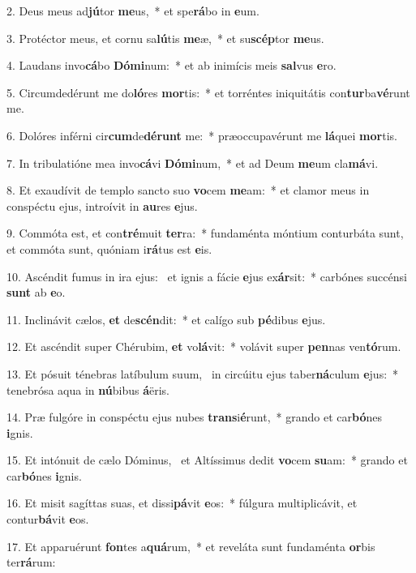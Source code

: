 2. Deus meus ad\textbf{jú}tor \textbf{me}us,~*  et spe\textbf{rá}bo in \textbf{e}um.\

3. Protéctor meus, et cornu sa\textbf{lú}tis \textbf{me}æ,~*  et su\textbf{scép}tor \textbf{me}us.\

4. Laudans invo\textbf{cá}bo \textbf{Dó}\textbf{mi}num:~*  et ab inimícis meis \textbf{sal}vus \textbf{e}ro.\

5. Circumdedérunt me do\textbf{ló}res \textbf{mor}tis:~*  et torréntes iniquitátis con\textbf{tur}ba\textbf{vé}runt me.\

6. Dolóres inférni cir\textbf{cum}de\textbf{dé}\textbf{runt} me:~*  præoccupavérunt me \textbf{lá}quei \textbf{mor}tis.\

7. In tribulatióne mea invo\textbf{cá}vi \textbf{Dó}\textbf{mi}num,~*  et ad Deum \textbf{me}um cla\textbf{má}vi.\

8. Et exaudívit de templo sancto suo \textbf{vo}cem \textbf{me}am:~*  et clamor meus in conspéctu ejus, introívit in \textbf{au}res \textbf{e}jus.\

9. Commóta est, et con\textbf{tré}muit \textbf{ter}ra:~*  fundaménta móntium conturbáta sunt, et commóta sunt, quóniam i\textbf{rá}tus est \textbf{e}is.\

10. Ascéndit fumus in ira ejus: \dag\  et ignis a fácie \textbf{e}jus ex\textbf{ár}sit:~*  carbónes succénsi \textbf{sunt} ab \textbf{e}o.\

11. Inclinávit cælos, \textbf{et} de\textbf{scén}dit:~*  et calígo sub \textbf{pé}dibus \textbf{e}jus.\

12. Et ascéndit super Chérubim, \textbf{et} vo\textbf{lá}vit:~*  volávit super \textbf{pen}nas ven\textbf{tó}rum.\

13. Et pósuit ténebras latíbulum suum, \dag\  in circúitu ejus taber\textbf{ná}culum \textbf{e}jus:~*  tenebrósa aqua in \textbf{nú}bibus \textbf{á}ëris.\

14. Præ fulgóre in conspéctu ejus nubes \textbf{trans}i\textbf{é}runt,~*  grando et car\textbf{bó}nes \textbf{i}gnis.\

15. Et intónuit de cælo Dóminus, \dag\  et Altíssimus dedit \textbf{vo}cem \textbf{su}am:~*  grando et car\textbf{bó}nes \textbf{i}gnis.\

16. Et misit sagíttas suas, et dissi\textbf{pá}vit \textbf{e}os:~*  fúlgura multiplicávit, et contur\textbf{bá}vit \textbf{e}os.\

17. Et apparuérunt \textbf{fon}tes a\textbf{quá}rum,~*  et reveláta sunt fundaménta \textbf{or}bis ter\textbf{rá}rum:\

